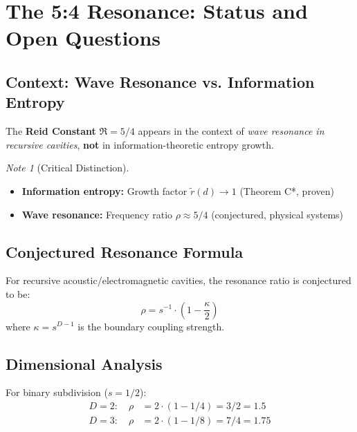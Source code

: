 \documentclass[11pt,a4paper]{article}
\theoremstyle{definition}
\theoremstyle{remark}
\newtheorem*{note}{Note}
\newcommand{\rtilde}{\tilde{r}}
\begin{document}
\section{The 5:4 Resonance: Status and Open Questions}
\label{sec:resonance}

\subsection{Context: Wave Resonance vs. Information Entropy}

The \textbf{Reid Constant} $\mathfrak{R} = 5/4$ appears in the context of \emph{wave resonance in recursive cavities}, \textbf{not} in information-theoretic entropy growth.

\begin{note}[Critical Distinction]
\begin{itemize}
    \item \textbf{Information entropy:} Growth factor $\rtilde(d) \to 1$ (Theorem C*, proven)
    \item \textbf{Wave resonance:} Frequency ratio $\rho \approx 5/4$ (conjectured, physical systems)
\end{itemize}
\end{note}

\subsection{Conjectured Resonance Formula}

For recursive acoustic/electromagnetic cavities, the resonance ratio is conjectured to be:
\begin{equation}
    \rho = s^{-1} \cdot \left(1 - \frac{\kappa}{2}\right)
    \label{eq:resonance}
\end{equation}
where $\kappa = s^{D-1}$ is the boundary coupling strength.

\subsection{Dimensional Analysis}

For binary subdivision ($s = 1/2$):
\begin{align}
    D = 2: \quad \rho &= 2 \cdot (1 - 1/4) = 3/2 = 1.5 \\
    D = 3: \quad \rho &= 2 \cdot (1 - 1/8) = 7/4 = 1.75
\end{align}
\end{document}
